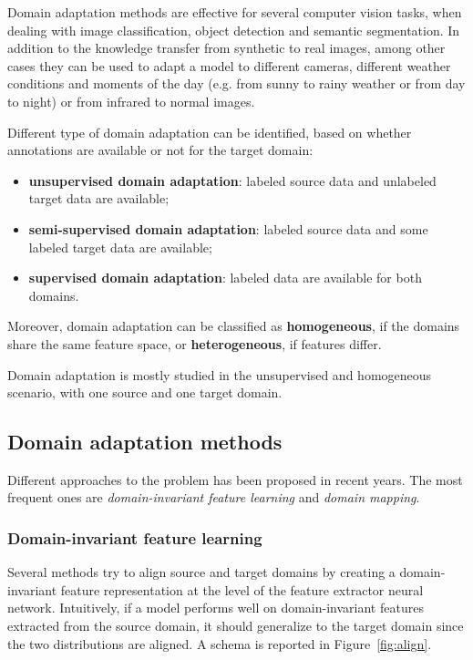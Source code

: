 \documentclass[%
    corpo=12pt,
    twoside,
    stile=classica,   
    tipotesi=magistrale,
    evenboxes,
    english
]{toptesi}
\begin{document}
Domain adaptation methods are effective for several computer vision tasks, when dealing with image classification, object detection and semantic segmentation. In addition to the knowledge transfer from synthetic to real images, among other cases they can be used to adapt a model to different cameras, different weather conditions and moments of the day (e.g. from sunny to rainy weather or from day to night) or from infrared to normal images.

Different type of domain adaptation can be identified, based on whether an\-no\-ta\-tions are available or not for the target domain:

\begin{itemize}
	\item \textbf{unsupervised domain adaptation}: labeled source data and unlabeled target data are available;
	\item \textbf{semi-supervised domain adaptation}: labeled source data and some labeled target data are available;
	\item \textbf{supervised domain adaptation}: labeled data are available for both domains.
\end{itemize}
Moreover, domain adaptation can be classified as \textbf{homogeneous}, if the domains share the same feature space, or \textbf{heterogeneous}, if features differ.

Domain adaptation is mostly studied in the unsupervised and homogeneous scenario, with one source and one target domain.

\subsection{Domain adaptation methods}
Different approaches to the problem has been proposed in recent years. The most frequent ones are \textit{domain-invariant feature learning} and \textit{domain mapping}.

\subsubsection{Domain-invariant feature learning}
Several methods try to align source and target domains by creating a domain-invariant feature representation at the level of the feature extractor neural network. Intuitively, if a model performs well on domain-invariant features extracted from the source domain, it should generalize to the target domain since the two distributions are aligned. A schema is reported in Figure~\ref{fig:align}.
\end{document}
